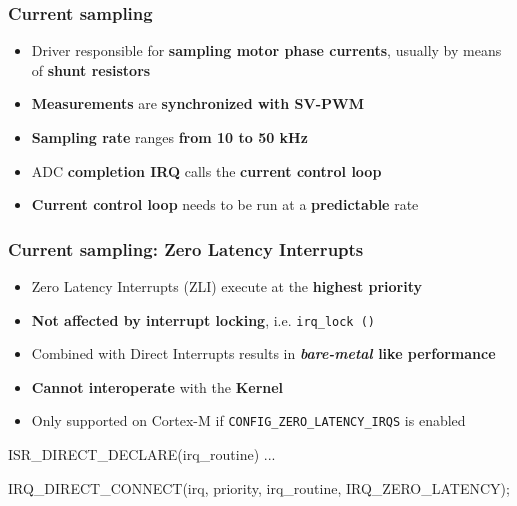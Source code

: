 \documentclass[handout]{beamer}
\begin{document}
\begin{frame}
  \frametitle{Current sampling}

  \begin{itemize}
    \item<1-> Driver responsible for \textbf{sampling motor phase currents},
          usually by means of \textbf{shunt resistors}
    \item<2-> \textbf{Measurements} are \textbf{synchronized with SV-PWM}
    \item<3-> \textbf{Sampling rate} ranges \textbf{from 10 to 50 kHz}
    \item<4-> ADC \textbf{completion IRQ} calls the \textbf{current control
            loop}
    \item<5-> \textbf{Current control loop} needs to be run at a
          \textbf{predictable} rate
  \end{itemize}
\end{frame}

\begin{frame}[fragile]
  \frametitle{Current sampling: Zero Latency Interrupts}

  \begin{itemize}
    \item<1-> Zero Latency Interrupts (ZLI) execute at the
          \textbf{highest priority}
    \item<2-> \textbf{Not affected by interrupt locking}, i.e.
          \texttt{irq\_lock ()}
    \item<3-> Combined with Direct Interrupts results in
          \textbf{\textit{bare-metal} like performance}
    \item<4-> \textbf{Cannot interoperate} with the \textbf{Kernel}
    \item<5-> Only supported on Cortex-M if \texttt{CONFIG\_ZERO\_LATENCY\_IRQS}
          is enabled
  \end{itemize}

  \begin{codebox}[C]
    ISR_DIRECT_DECLARE(irq_routine)
    {
        ...
    }

    IRQ_DIRECT_CONNECT(irq, priority, irq_routine, IRQ_ZERO_LATENCY);
  \end{codebox}
\end{frame}
\end{document}
